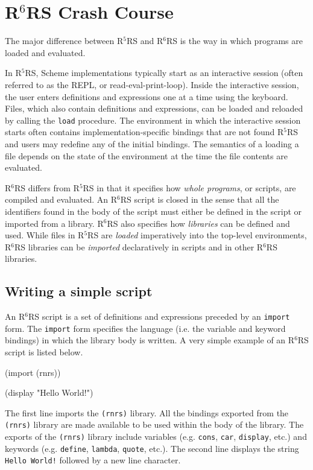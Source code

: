 \documentclass[onecolumn, 12pt, twoside, openright, dvipdfm]{book}
\newcommand{\rnrs}[1]{R$^{\mathrm{#1}}$RS}
\begin{document}
\chapter{\rnrs{6} Crash Course}

The major difference between \rnrs{5} and \rnrs{6} is the way
in which programs are loaded and evaluated.  

In \rnrs{5}, Scheme implementations typically start as an
interactive session (often referred to as the REPL, or
read-eval-print-loop).  Inside the interactive session, the user
enters definitions and expressions one at a time using the keyboard.
Files, which also contain definitions and expressions, can be loaded
and reloaded by calling the \texttt{load} procedure.  The
environment in which the interactive session starts often contains
implementation-specific bindings that are not found \rnrs{5} and
users may redefine any of the initial bindings.  The semantics of a
loading a file depends on the state of the environment at the time
the file contents are evaluated.

\index{R6RS Script@\rnrs{6} Script!Import}
\rnrs{6} differs from \rnrs{5} in that it specifies how \emph{whole
programs}, or scripts, are compiled and evaluated.  An \rnrs{6}
script is closed in the sense that all the identifiers found in the
body of the script must either be defined in the script or imported
from a library.  \rnrs{6} also specifies how \emph{libraries} can be
defined and used.  While files in \rnrs{5} are \emph{loaded}
imperatively into the top-level environments, \rnrs{6} libraries can
be \emph{imported} declaratively in scripts and in other \rnrs{6}
libraries. 

\section{\label{sec:scripts}Writing a simple script}

An \rnrs{6} script is a set of definitions and expressions preceded
by an \texttt{import} form.  The \texttt{import} form specifies
the language (i.e. the variable and keyword bindings) in which the
library body is written.  A very simple example of an \rnrs{6}
script is listed below.

\begin{CodeInline}
(import (rnrs))

(display "Hello World!\n")
\end{CodeInline}

The first line imports the \texttt{(rnrs)} library.  All the
bindings exported from the \texttt{(rnrs)} library are made
available to be used within the body of the library.  
The exports of the \texttt{(rnrs)} library include variables
(e.g. \texttt{cons}, \texttt{car}, \texttt{display}, etc.) and
keywords (e.g.  \texttt{define}, \texttt{lambda}, \texttt{quote},
etc.).  The second line displays the string \texttt{Hello World!}
followed by a new line character.
\end{document}
